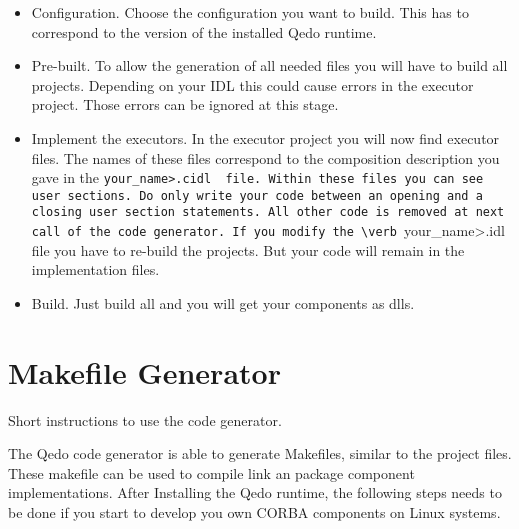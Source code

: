\documentclass[12pt,a4paper]{report}
\begin{document}
\begin{itemize}
	\item Configuration. Choose the configuration you want to build. This has to correspond to the version of the installed Qedo runtime.

	\item Pre-built.
	To allow the generation of all needed files you will have to build all projects. Depending on your IDL this could cause errors in the executor project. Those errors can be ignored at this stage.

	\item Implement the executors. 
	In the executor project you will now find executor files. The names of these files correspond to the composition description you gave in the \verb <your_name>.cidl  file. Within these files you can see user sections. Do only write your code between an opening and a closing user section statements. All other code is removed at next call of the code generator. If you modify the \verb <your_name>.idl  file you have to re-build the projects. But your code will remain in the implementation files.

	\item Build. Just build all and you will get your components as dlls.

\end{itemize}

\section{Makefile Generator}
\label{sec:MakefileGenerator}

Short instructions to use the code generator.

The Qedo code generator is able to generate Makefiles, similar to the project files. These makefile can be used to compile link an package component implementations.
After Installing the Qedo runtime, the following steps needs to be done if you start to develop you own CORBA components on Linux systems.
\end{document}
